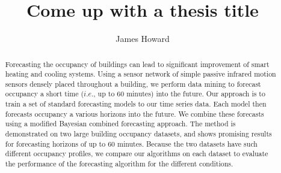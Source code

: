 \documentclass[letterpaper,12pt]{article}
\title{Come up with a thesis title}
\author{James Howard}
\begin{document}
\frontmatter

\maketitle
\newpage

\makecopyright{\the\year}
\newpage


\makesubmittal
\newpage

\begin{abstract}
Forecasting the occupancy of buildings can lead to significant improvement of smart heating and cooling systems. Using a sensor network of simple passive infrared motion sensors densely placed throughout a building, we perform data mining to forecast occupancy a short time ($i.e.$, up to 60 minutes) into the future.  Our approach is to train a set of standard forecasting models to our time series data.  Each model then forecasts occupancy a various horizons into the future.  We combine these forecasts using a modified Bayesian combined forecasting approach.  The method is demonstrated on two large building occupancy datasets, and shows promising results for forecasting horizons of up to 60 minutes.  Because the two datasets have such different occupancy profiles, we compare our algorithms on each dataset to evaluate the performance of the forecasting algorithm for the different conditions.
\end{abstract}

\newpage


\tableofcontents
\newpage


\listoffiguresandtables
\newpage


\newpage

\listofabbreviations*
\newpage
\end{document}
